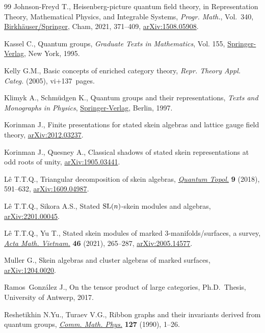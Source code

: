\documentclass[pdftex]{sigma}%
\numberwithin{equation}{section}
\begin{document}
\begin{thebibliography}{99}
Johnson-Freyd T., Heisenberg-picture quantum field theory, in Representation
 Theory, Mathematical Physics, and Integrable Systems, \textit{Progr. Math.},
 Vol.~340, \href{https://doi.org/10.1007/978-3-030-78148-4_13}{Birkh\"auser/Springer}, Cham, 2021, 371--409, \href{http://arxiv.org/abs/1508.05908}{arXiv:1508.05908}.

Kassel C., Quantum groups, \textit{Graduate Texts in Mathematics}, Vol. 155,
 \href{https://doi.org/10.1007/978-1-4612-0783-2}{Springer-Verlag}, New York, 1995.

Kelly G.M., Basic concepts of enriched category theory, \textit{Repr. Theory
 Appl. Categ.} (2005), vi+137~pages.

Klimyk A., Schm\"udgen K., Quantum groups and their representations, \textit{Texts and
 Monographs in Physics}, \href{https://doi.org/10.1007/978-3-642-60896-4}{Springer-Verlag}, Berlin, 1997.

Korinman J., Finite presentations for stated skein algebras and lattice gauge
 field theory, \href{http://arxiv.org/abs/2012.03237}{arXiv:2012.03237}.

Korinman J., Quesney A., Classical shadows of stated skein representations at
 odd roots of unity, \href{http://arxiv.org/abs/1905.03441}{arXiv:1905.03441}.

L\^e T.T.Q., Triangular decomposition of skein algebras, \href{https://doi.org/10.4171/QT/115}{\textit{Quantum
 Topol.}} \textbf{9} (2018), 591--632, \href{http://arxiv.org/abs/1609.04987}{arXiv:1609.04987}.

L\^e T.T.Q., Sikora A.S., Stated ${\rm SL}(n)$-skein modules and algebras,
 \href{http://arxiv.org/abs/2201.00045}{arXiv:2201.00045}.

L\^e T.T.Q., Yu T., Stated skein modules of marked 3-manifolds/surfaces, a
 survey, \href{https://doi.org/10.1007/s40306-021-00417-2}{\textit{Acta Math. Vietnam.}} \textbf{46} (2021), 265--287,
 \href{http://arxiv.org/abs/2005.14577}{arXiv:2005.14577}.

Muller G., Skein algebras and cluster algebras of marked surfaces,
 \href{http://arxiv.org/abs/1204.0020}{arXiv:1204.0020}.

Ramos~Gonz\'alez J., On the tensor product of large categories, Ph.D.~Thesis,
 {U}niversity of Antwerp, 2017.

Reshetikhin N.Yu., Turaev V.G., Ribbon graphs and their invariants derived from
 quantum groups, \href{https://doi.org/10.1007/BF02096491}{\textit{Comm. Math. Phys.}} \textbf{127} (1990), 1--26.


\end{thebibliography}
\end{document}
